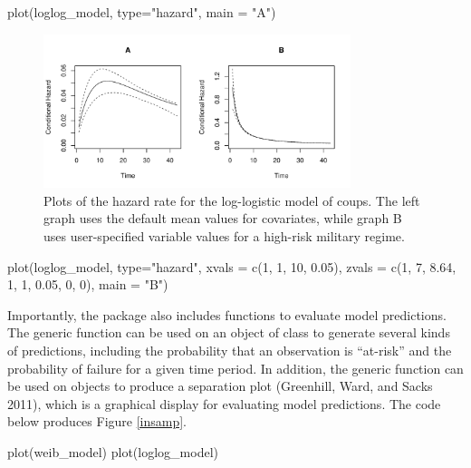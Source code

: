 \documentclass[article]{jss}
\begin{document}
\begin{CodeChunk}
\begin{CodeInput}
plot(loglog_model, type="hazard", main = "A")
\end{CodeInput}
\end{CodeChunk}

\begin{figure}
\begin{center}
\includegraphics[width=0.8\textwidth]{graphics/hazard-ex.pdf}
\caption{Plots of the hazard rate for the log-logistic model of coups. The left graph uses the default mean values for covariates, while graph B uses user-specified variable values for a high-risk military regime.}
\label{hazard-ex}
\end{center}
\end{figure}

\begin{CodeChunk}
\begin{CodeInput}
plot(loglog_model, type="hazard", 
     xvals = c(1, 1, 10, 0.05), 
     zvals = c(1, 7, 8.64, 1, 1, 0.05, 0, 0),
     main = "B")
\end{CodeInput}
\end{CodeChunk}

Importantly, the package also includes functions to evaluate model
predictions. The generic function  can be used on an
object of class  to generate several kinds of predictions,
including the probability that an observation is ``at-risk'' and the
probability of failure for a given time period. In addition, the generic
 function can be used on  objects to produce a
separation plot (Greenhill, Ward, and Sacks 2011), which is a graphical
display for evaluating model predictions. The code below produces Figure
\ref{insamp}.

\begin{CodeChunk}
\begin{CodeInput}
plot(weib_model)
plot(loglog_model)
\end{CodeInput}
\end{CodeChunk}
\end{document}
